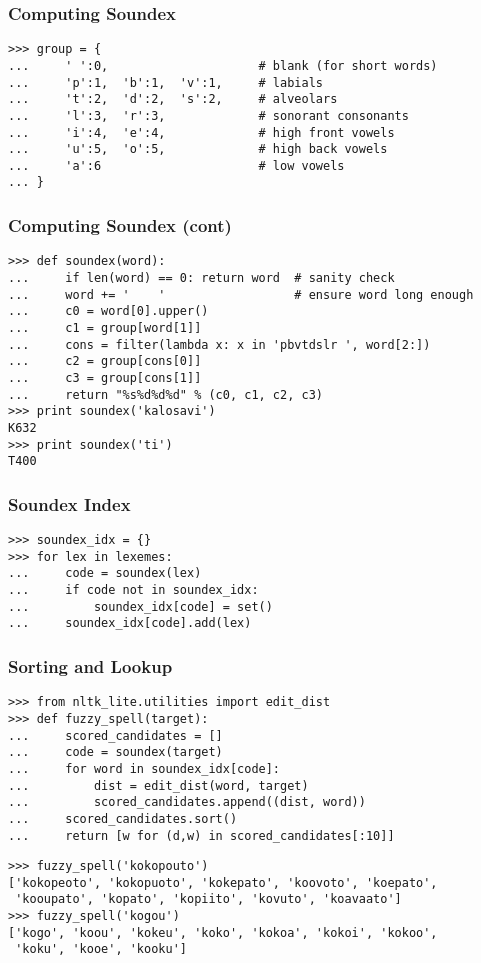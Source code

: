 \documentclass{beamer}             %
\begin{document}
\begin{frame}[fragile]
\frametitle{Computing Soundex}
\scriptsize

\begin{verbatim}
>>> group = {
...     ' ':0,                     # blank (for short words)
...     'p':1,  'b':1,  'v':1,     # labials
...     't':2,  'd':2,  's':2,     # alveolars
...     'l':3,  'r':3,             # sonorant consonants
...     'i':4,  'e':4,             # high front vowels
...     'u':5,  'o':5,             # high back vowels
...     'a':6                      # low vowels
... }
\end{verbatim}
\end{frame}

\begin{frame}[fragile]
\frametitle{Computing Soundex (cont)}
\scriptsize

\begin{verbatim}
>>> def soundex(word):
...     if len(word) == 0: return word  # sanity check
...     word += '    '                  # ensure word long enough
...     c0 = word[0].upper()
...     c1 = group[word[1]]
...     cons = filter(lambda x: x in 'pbvtdslr ', word[2:])
...     c2 = group[cons[0]]
...     c3 = group[cons[1]]
...     return "%s%d%d%d" % (c0, c1, c2, c3)
>>> print soundex('kalosavi')
K632
>>> print soundex('ti')
T400
\end{verbatim}
\end{frame}

\begin{frame}[fragile]
\frametitle{Soundex Index}
\begin{verbatim}
>>> soundex_idx = {}
>>> for lex in lexemes:
...     code = soundex(lex)
...     if code not in soundex_idx:
...         soundex_idx[code] = set()
...     soundex_idx[code].add(lex)
\end{verbatim}
\end{frame}

\begin{frame}[fragile]
\frametitle{Sorting and Lookup}
\scriptsize
\begin{verbatim}
>>> from nltk_lite.utilities import edit_dist
>>> def fuzzy_spell(target):
...     scored_candidates = []
...     code = soundex(target)
...     for word in soundex_idx[code]:
...         dist = edit_dist(word, target)
...         scored_candidates.append((dist, word))
...     scored_candidates.sort()
...     return [w for (d,w) in scored_candidates[:10]]
\end{verbatim}

\begin{verbatim}
>>> fuzzy_spell('kokopouto')
['kokopeoto', 'kokopuoto', 'kokepato', 'koovoto', 'koepato',
 'kooupato', 'kopato', 'kopiito', 'kovuto', 'koavaato']
>>> fuzzy_spell('kogou')
['kogo', 'koou', 'kokeu', 'koko', 'kokoa', 'kokoi', 'kokoo',
 'koku', 'kooe', 'kooku']
\end{verbatim}
\end{frame}
\end{document}
